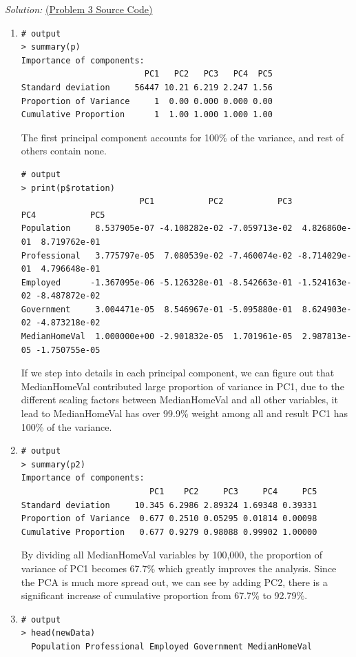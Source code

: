 \documentclass{article}
\newenvironment{solution}
    {\textit{Solution:}}
    {}
\begin{document}
\begin{solution}
\href{run:./src/p3.r}{ (Problem 3 Source Code)}
\begin{enumerate}
\item\mbox{}
	\begin{lstlisting}
# output
> summary(p)
Importance of components:
                         PC1   PC2   PC3   PC4  PC5
Standard deviation     56447 10.21 6.219 2.247 1.56
Proportion of Variance     1  0.00 0.000 0.000 0.00
Cumulative Proportion      1  1.00 1.000 1.000 1.00
	\end{lstlisting}
The first principal component accounts for 100\% of the variance, and rest of others contain none.
	\begin{lstlisting}
# output
> print(p$rotation)
                        PC1           PC2           PC3           PC4           PC5
Population     8.537905e-07 -4.108282e-02 -7.059713e-02  4.826860e-01  8.719762e-01
Professional   3.775797e-05  7.080539e-02 -7.460074e-02 -8.714029e-01  4.796648e-01
Employed      -1.367095e-06 -5.126328e-01 -8.542663e-01 -1.524163e-02 -8.487872e-02
Government     3.004471e-05  8.546967e-01 -5.095880e-01  8.624903e-02 -4.873218e-02
MedianHomeVal  1.000000e+00 -2.901832e-05  1.701961e-05  2.987813e-05 -1.750755e-05
	\end{lstlisting}
If we step into details in each principal component, we can figure out that MedianHomeVal contributed large proportion of variance in PC1, due to the different scaling factors between MedianHomeVal and all other variables, it lead to MedianHomeVal has over 99.9\% weight among all and result PC1 has 100\% of the variance.
\item\mbox{}
	\begin{lstlisting}
# output
> summary(p2)
Importance of components:
                          PC1    PC2     PC3     PC4     PC5
Standard deviation     10.345 6.2986 2.89324 1.69348 0.39331
Proportion of Variance  0.677 0.2510 0.05295 0.01814 0.00098
Cumulative Proportion   0.677 0.9279 0.98088 0.99902 1.00000
	\end{lstlisting}
By dividing all MedianHomeVal variables by 100,000, the proportion of variance of PC1 becomes 67.7\% which greatly improves the analysis. Since the PCA is much more spread out, we can see by adding PC2, there is a significant increase of cumulative proportion from 67.7\% to 92.79\%.
\item\mbox{}
	\begin{lstlisting}
# output
> head(newData)
  Population Professional Employed Government MedianHomeVal

\end{lstlisting}
\end{enumerate}
\end{solution}
\end{document}

